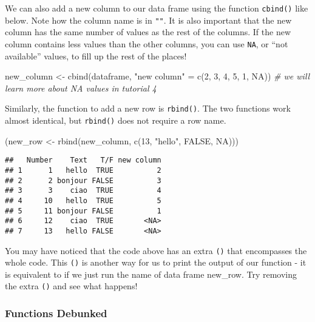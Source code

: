 \documentclass[
]{book}
\newenvironment{Shaded}{\begin{snugshade}}{\end{snugshade}}
\newcommand{\CommentTok}[1]{\textcolor[rgb]{0.56,0.35,0.01}{\textit{#1}}}
\newcommand{\ConstantTok}[1]{\textcolor[rgb]{0.00,0.00,0.00}{#1}}
\newcommand{\DecValTok}[1]{\textcolor[rgb]{0.00,0.00,0.81}{#1}}
\newcommand{\FunctionTok}[1]{\textcolor[rgb]{0.00,0.00,0.00}{#1}}
\newcommand{\NormalTok}[1]{#1}
\newcommand{\OtherTok}[1]{\textcolor[rgb]{0.56,0.35,0.01}{#1}}
\newcommand{\StringTok}[1]{\textcolor[rgb]{0.31,0.60,0.02}{#1}}
\begin{document}
We can also add a new column to our data frame using the function \texttt{cbind()} like below. Note how the column name is in \texttt{""}. It is also important that the new column has the same number of values as the rest of the columns. If the new column contains less values than the other columns, you can use \texttt{NA}, or ``not available'' values, to fill up the rest of the places!

\begin{Shaded}
\begin{Highlighting}[]
\NormalTok{new\_column }\OtherTok{\textless{}{-}} \FunctionTok{cbind}\NormalTok{(dataframe, }\StringTok{"new column"} \OtherTok{=} \FunctionTok{c}\NormalTok{(}\DecValTok{2}\NormalTok{, }\DecValTok{3}\NormalTok{, }\DecValTok{4}\NormalTok{, }\DecValTok{5}\NormalTok{, }\DecValTok{1}\NormalTok{, }\ConstantTok{NA}\NormalTok{))}
    \CommentTok{\# we will learn more about NA values in tutorial 4}
\end{Highlighting}
\end{Shaded}

Similarly, the function to add a new row is \texttt{rbind()}. The two functions work almost identical, but \texttt{rbind()} does not require a row name.

\begin{Shaded}
\begin{Highlighting}[]
\NormalTok{(new\_row }\OtherTok{\textless{}{-}} \FunctionTok{rbind}\NormalTok{(new\_column, }\FunctionTok{c}\NormalTok{(}\DecValTok{13}\NormalTok{, }\StringTok{"hello"}\NormalTok{, }\ConstantTok{FALSE}\NormalTok{, }\ConstantTok{NA}\NormalTok{)))}
\end{Highlighting}
\end{Shaded}

\begin{verbatim}
##   Number    Text   T/F new column
## 1      1   hello  TRUE          2
## 2      2 bonjour FALSE          3
## 3      3    ciao  TRUE          4
## 4     10   hello  TRUE          5
## 5     11 bonjour FALSE          1
## 6     12    ciao  TRUE       <NA>
## 7     13   hello FALSE       <NA>
\end{verbatim}

You may have noticed that the code above has an extra \texttt{()} that encompasses the whole code. This \texttt{()} is another way for us to print the output of our function - it is equivalent to if we just run the name of data frame new\_row. Try removing the extra \texttt{()} and see what happens!

\hypertarget{functions-debunked-4}{%
\subsubsection{Functions Debunked}\label{functions-debunked-4}}
\end{document}
